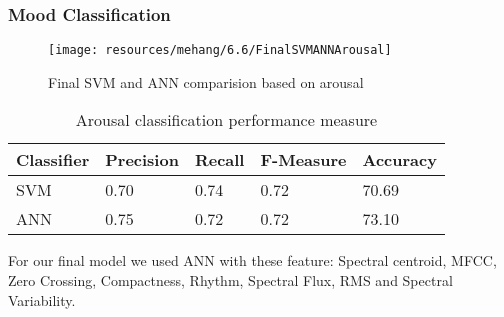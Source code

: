 \subsubsection{Mood Classification}
\begin{figure}[h!]
        \centering
        \texttt{[image: resources/mehang/6.6/FinalSVMANNArousal]}
        \caption{Final SVM and ANN comparision based on arousal}
\end{figure}

\begin{table}[h!]
        \caption{Arousal classification performance measure}
        \begin{center}
                \begin{tabular}{|l|l|l|l|l|}
                        \hline

                        Classifier
                        &
                        Precision 
                        &
                        Recall 
                        &
                        F-Measure
                        &
                        Accuracy
                        \\\hline

                        SVM
                        &
                        0.70
                        &
                        0.74
                        &
                        0.72
                        &
                        70.69
                        \\\hline

                        ANN
                        &
                        0.75
                        &
                        0.72
                        &
                        0.72
                        &
                        73.10
                        \\\hline

                \end{tabular}
        \end{center}
\end{table}

For our final model we used ANN with these feature: Spectral centroid, MFCC, Zero Crossing, Compactness, Rhythm, Spectral Flux, RMS and Spectral Variability.

